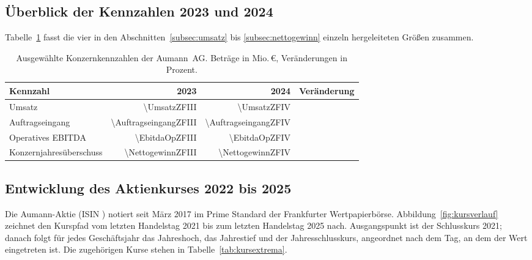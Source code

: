 \subsection*{\"Uberblick der Kennzahlen 2023 und 2024}

Tabelle~\ref{tab:kennzahlen-ueberblick} fasst die vier in den
Abschnitten~\ref{subsec:umsatz} bis \ref{subsec:nettogewinn} einzeln
hergeleiteten Gr\"o{\ss}en zusammen.

\begin{table}[!htbp]
\centering
\caption{Ausgew\"ahlte Konzernkennzahlen der Aumann~AG. Betr\"age in
Mio.\,\euro, Ver\"anderungen in Prozent.}
\label{tab:kennzahlen-ueberblick}
\begin{tabular}{@{}lrrr@{}}
\toprule
\textbf{Kennzahl} & \textbf{2023} & \textbf{2024} & \textbf{Ver\"anderung}\\
\midrule
Umsatz                    & \num{\UmsatzZFIII}          & \num{\UmsatzZFIV}
                          & \Pct{\UmsatzDeltaZFIV}\\
Auftragseingang           & \num{\AuftragseingangZFIII} & \num{\AuftragseingangZFIV}
                          & \Pct{\AuftragseingangDeltaZFIV}\\
Operatives EBITDA         & \num{\EbitdaOpZFIII}        & \num{\EbitdaOpZFIV}
                          & \Pct{\EbitdaOpDeltaZFIV}\\
Konzernjahres\"uberschuss & \num{\NettogewinnZFIII}     & \num{\NettogewinnZFIV}
                          & \Pct{\NettogewinnDeltaZFIV}\\
\bottomrule
\end{tabular}
\end{table}

\subsection{Entwicklung des Aktienkurses 2022 bis 2025}
\label{subsec:kursverlauf}

Die Aumann-Aktie (ISIN
\ISIN{})
notiert seit M\"arz 2017 im Prime Standard der Frankfurter
Wertpapierb\"orse.
Abbildung~\ref{fig:kursverlauf} zeichnet den Kurspfad vom letzten Handelstag
2021 bis zum letzten Handelstag 2025 nach. Ausgangspunkt ist der
Schlusskurs 2021; danach folgt f\"ur jedes Gesch\"aftsjahr das Jahreshoch,
das Jahrestief und der Jahresschlusskurs, angeordnet nach dem Tag, an dem
der Wert eingetreten ist. Die zugeh\"origen Kurse stehen in
Tabelle~\ref{tab:kursextrema}.

